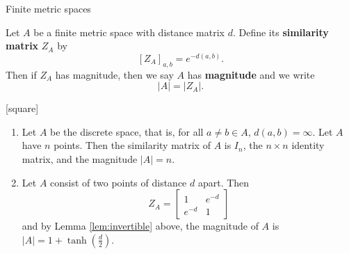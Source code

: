 \documentclass[12pt,mathserif]{beamer}
\begin{document}
\begin{frame}[allowframebreaks]{Finite metric spaces}

\begin{definition}
Let $A$ be a finite metric space with distance matrix $d$. Define its \textbf{similarity matrix} $Z_A$ by
\begin{equation*}
\left[Z_A\right]_{a,b} = e^{-d(a,b)}.
\end{equation*}
Then if $Z_A$ has magnitude, then we say $A$ has \textbf{magnitude} and we write
\begin{equation*}
\vert A \vert = \vert Z_A \vert.
\end{equation*}
\end{definition}

\framebreak

\begin{example}
[square]
\begin{enumerate}
\item Let $A$ be the discrete space, that is, for all $a\neq b \in A$, $d(a,b) = \infty$. Let $A$ have $n$ points. Then the similarity matrix of $A$ is $I_n$, the $n\times n$ identity matrix, and the magnitude $\vert A \vert = n$.
\item Let $A$ consist of two points of distance $d$ apart. Then
\begin{equation*}
Z_A = \begin{bmatrix} 1 & e^{-d} \\ e^{-d} & 1 \end{bmatrix}
\end{equation*}
and by Lemma \ref{lem:invertible} above, the magnitude of $A$ is $\vert A \vert = 1 + \tanh\left(\frac{d}{2}\right)$.
\end{enumerate}
\end{example}

\end{frame}
\end{document}
